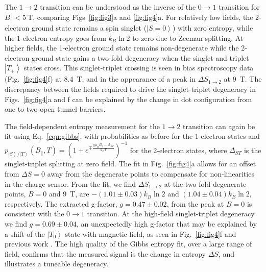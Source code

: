 \documentclass[twocolumn,showpacs,amsmath,amssymb,prl,aps,superscriptaddress]{revtex4-1}
\newcommand{\ket}[1]{\ensuremath{\left|#1\right\rangle}}
\begin{document}
The $1\rightarrow 2$ transition can be understood as the inverse of the $0 \rightarrow 1$ transition for $B_\parallel < \SI{5}{\tesla}$, comparing Figs~\ref{fig:fig3}a and \ref{fig:fig4}a. For relatively low fields, the 2-electron ground state remains a spin singlet ($\ket{S=0}$) with zero entropy, while the 1-electron entropy goes from $k_B\ln{2}$ to zero due to Zeeman splitting.  At higher fields, the 1-electron ground state remains non-degenerate while the 2-electron ground state gains a two-fold degeneracy when the singlet and triplet \ket{T_+} states cross.  This singlet-triplet crossing is seen in bias spectroscopy data (Fig.~\ref{fig:fig4}f) at \SI{8.4}{\tesla}, and in the appearance of a peak in $\Delta S_{1\rightarrow 2}$ at \SI{9}{\tesla}.  The discrepancy between the fields required to drive the singlet-triplet degeneracy in Figs.~\ref{fig:fig4}a and f can be explained by the change in dot configuration from one to two open tunnel barriers.

The field-dependent entropy measurement for the $1 \rightarrow 2$ transition can again be fit using Eq.~\ref{eqn:gibbs}, with probabilities as before for the 1-electron states and $p_{\ket{S}/\ket{T}}(B_\parallel, T) = (1+ e^{\mp \frac{g\mu_B B_\parallel - \Delta_{ST}}{k_B T}})^{-1}$ for the 2-electron states, where $\Delta_{ST}$ is the singlet-triplet splitting at zero field. The fit in Fig.~\ref{fig:fig4}a allows for an offset from $\Delta S=0$ away from the degenerate points to compensate for non-linearities in the charge sensor. From the fit, we find $\Delta S_{1\rightarrow 2}$ at the two-fold degenerate points, $B=0$ and \SI{9}{\tesla}, are $-(1.01\pm0.03) k_B \ln{2}$ and $(1.04 \pm 0.04) k_B \ln{2}$, respectively. The extracted g-factor, $g = 0.47 \pm 0.02$, from the peak at $B=0$ is consistent with the $0\rightarrow 1$ transition.  At the high-field singlet-triplet degeneracy we find $g = 0.69 \pm 0.04$, an unexpectedly high g-factor that may be explained by a shift of the $\ket{T_0}$ state with magnetic field, as seen in Fig.~\ref{fig:fig4}f and previous work \cite{Szafran2004}.  The high quality of the Gibbs entropy fit, over a large range of field, confirms that the measured signal is the change in entropy $\Delta S$, and illustrates a tuneable degeneracy.

\end{document}
